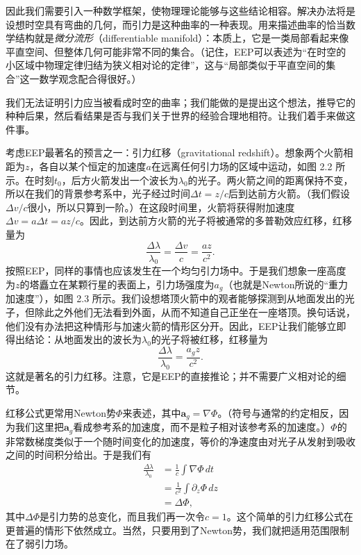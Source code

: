 因此我们需要引入一种数学框架，使物理理论能够与这些结论相容。解决办法将是设想时空具有弯曲的几何，而引力是这种曲率的一种表现。用来描述曲率的恰当数学结构就是\emph{微分流形}（differentiable manifold）：本质上，它是一类局部看起来像平直空间、但整体几何可能非常不同的集合。（记住，EEP可以表述为“在时空的小区域中物理定律归结为狭义相对论的定律”，这与“局部类似于平直空间的集合”这一数学观念配合得很好。）

我们无法证明引力应当被看成时空的曲率；我们能做的是提出这个想法，推导它的种种后果，然后看结果是否与我们关于世界的经验合理地相符。让我们着手来做这件事。

考虑EEP最著名的预言之一：引力红移（gravitational redshift）。想象两个火箭相距为$z$，各自以某个恒定的加速度$a$在远离任何引力场的区域中运动，如图 2.2 所示。在时刻$t_0$，后方火箭发出一个波长为$\lambda_0$的光子。两火箭之间的距离保持不变，所以在我们的背景参考系中，光子经过时间$\Delta t = z/c$后到达前方火箭。（我们假设$\Delta v/c$很小，所以只算到一阶。）在这段时间里，火箭将获得附加速度$\Delta v = a\Delta t = az/c$。因此，到达前方火箭的光子将被通常的多普勒效应红移，红移量为
\begin{equation*}
\frac{\Delta\lambda}{\lambda_0} = \frac{\Delta v}{c} = \frac{az}{c^2}.
\tag{2.5}
\end{equation*}
按照EEP，同样的事情也应该发生在一个均匀引力场中。于是我们想象一座高度为$z$的塔矗立在某颗行星的表面上，引力场强度为$a_g$（也就是Newton所说的“重力加速度”），如图 2.3 所示。我们设想塔顶火箭中的观者能够探测到从地面发出的光子，但除此之外他们无法看到外面，从而不知道自己正坐在一座塔顶。换句话说，他们没有办法把这种情形与加速火箭的情形区分开。因此，EEP让我们能够立即得出结论：从地面发出的波长为$\lambda_0$的光子将被红移，红移量为
\begin{equation*}
\frac{\Delta\lambda}{\lambda_0} = \frac{a_g z}{c^2}.
\tag{2.6}
\end{equation*}
这就是著名的引力红移。注意，它是EEP的直接推论；并不需要广义相对论的细节。


红移公式更常用Newton势$\Phi$来表述，其中$\mathbf{a}_g = \nabla\Phi$。（符号与通常的约定相反，因为我们这里把$\mathbf{a}_g$看成参考系的加速度，而不是粒子相对该参考系的加速度。）$\Phi$的非常数梯度类似于一个随时间变化的加速度，等价的净速度由对光子从发射到吸收之间的时间积分给出。于是我们有
\begin{align*}
\frac{\Delta\lambda}{\lambda_0} &= \frac{1}{c}\int \nabla\Phi\, dt\\
&= \frac{1}{c^2}\int \partial_z\Phi\, dz\\
&= \Delta\Phi,
\tag{2.7}
\end{align*}
其中$\Delta\Phi$是引力势的总变化，而且我们再一次令$c=1$。这个简单的引力红移公式在更普遍的情形下依然成立。当然，只要用到了Newton势，我们就把适用范围限制在了弱引力场。


